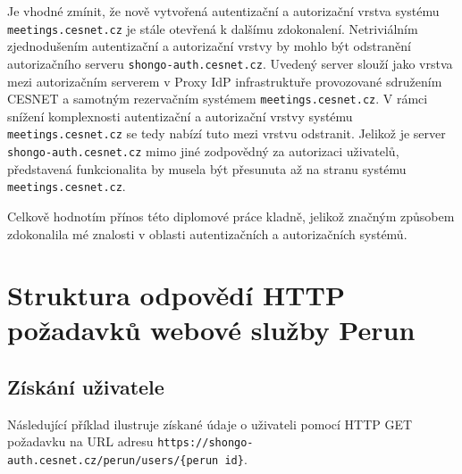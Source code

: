 \documentclass[
  printed, %
  twoside, %
  table,   %
  nolof,     %
  nolot,     %
]{fithesis3}
\begin{document}
\par

Je vhodné zmínit, že nově vytvořená autentizační a autorizační vrstva systému \texttt{meetings.cesnet.cz} je stále otevřená k dalšímu zdokonalení. Netriviálním zjednodušením autentizační a autorizační vrstvy by mohlo být odstranění autorizačního serveru \texttt{shongo-auth.cesnet.cz}. Uvedený server slouží jako vrstva mezi autorizačním serverem v Proxy IdP infrastruktuře provozované sdružením CESNET a samotným rezervačním systémem \texttt{meetings.cesnet.cz}. V rámci snížení komplexnosti autentizační a autorizační vrstvy systému \texttt{meetings.cesnet.cz} se tedy nabízí tuto mezi vrstvu odstranit. Jelikož je server \texttt{shongo-auth.cesnet.cz} mimo jiné zodpovědný za autorizaci uživatelů, představená funkcionalita by musela být přesunuta až na stranu systému \texttt{meetings.cesnet.cz}. 

\par 

Celkově hodnotím přínos této diplomové práce kladně, jelikož značným způsobem zdokonalila mé znalosti v oblasti autentizačních a autorizačních systémů.

\printbibliography[title={Literatura}]

\appendix %


\chapter{Struktura odpovědí HTTP požadavků webové služby Perun}

\section{Získání uživatele}
\label{table:perunws:user}
Následující příklad ilustruje získané údaje o uživateli pomocí HTTP GET požadavku na URL adresu \texttt{https://shongo-auth.cesnet.cz/perun/users/\{perun id\}}.
\end{document}
